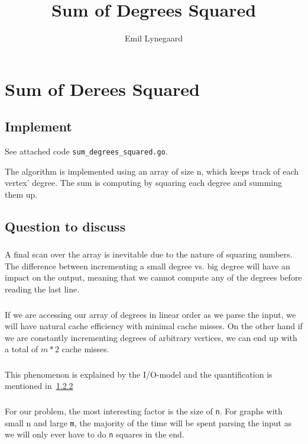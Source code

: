 \documentclass[a5paper]{article}
\title{Sum of Degrees Squared}
\author{Emil Lynegaard}
\begin{document}
  \maketitle
  \section{Sum of Derees Squared}
  \subsection{Implement}
  See attached code \texttt{sum\_degrees\_squared.go}.

  The algorithm is implemented using an array of size n, which keeps track of each vertex' degree.
  The sum is computing by squaring each degree and summing them up.

  \subsection{Question to discuss}
  \subsubsection{}
  A final scan over the array is inevitable due to the nature of squaring numbers.
  The difference between incrementing a small degree vs. \a big degree will have an impact on the output, meaning that we cannot compute any of the degrees before reading the last line.
  \subsubsection{}\label{sec:cache_misses}
  If we are accessing our array of degrees in linear order as we parse the input, we will have natural cache efficiency with minimal cache misses. On the other hand if we are constantly incrementing degrees of arbitrary vertices, we can end up with a total of $m*2$ cache misses.
  \subsubsection{}
  This phenomenon is explained by the I/O-model and the quantification is mentioned in~\ref{sec:cache_misses}
  \subsubsection{}
  For our problem, the most interesting factor is the size of \texttt{n}. For graphs with small n and large \texttt{m}, the majority of the time will be spent parsing the input as we will only ever have to do \texttt{n} squares in the end.
\end{document}
